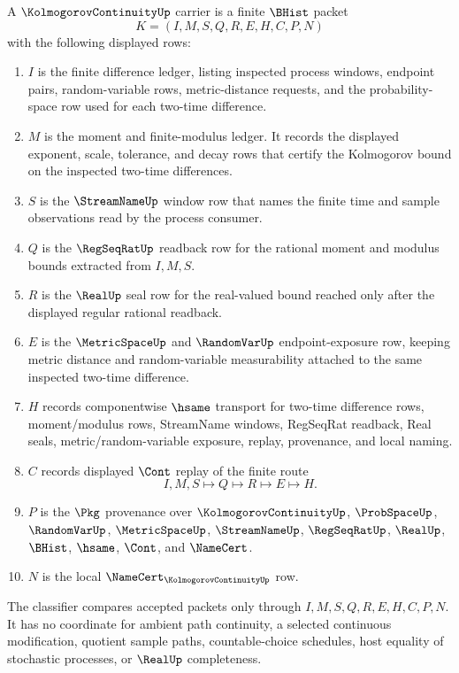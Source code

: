 \begin{definition}
\label{def:kolmogorov-continuity-carrier}
A $\KolmogorovContinuityUp$ carrier is a finite $\BHist$ packet
$$
K=(I,M,S,Q,R,E,H,C,P,N)
$$
with the following displayed rows:
\begin{enumerate}
\item $I$ is the finite difference ledger, listing inspected process windows, endpoint pairs, random-variable rows, metric-distance requests, and the probability-space row used for each two-time difference.
\item $M$ is the moment and finite-modulus ledger. It records the displayed exponent, scale, tolerance, and decay rows that certify the Kolmogorov bound on the inspected two-time differences.
\item $S$ is the $\StreamNameUp$ window row that names the finite time and sample observations read by the process consumer.
\item $Q$ is the $\RegSeqRatUp$ readback row for the rational moment and modulus bounds extracted from $I,M,S$.
\item $R$ is the $\RealUp$ seal row for the real-valued bound reached only after the displayed regular rational readback.
\item $E$ is the $\MetricSpaceUp$ and $\RandomVarUp$ endpoint-exposure row, keeping metric distance and random-variable measurability attached to the same inspected two-time difference.
\item $H$ records componentwise $\hsame$ transport for two-time difference rows, moment/modulus rows, StreamName windows, RegSeqRat readback, Real seals, metric/random-variable exposure, replay, provenance, and local naming.
\item $C$ records displayed $\Cont$ replay of the finite route
$$
I,M,S \longmapsto Q \longmapsto R \longmapsto E \longmapsto H .
$$
\item $P$ is the $\Pkg$ provenance over $\KolmogorovContinuityUp$, $\ProbSpaceUp$, $\RandomVarUp$, $\MetricSpaceUp$, $\StreamNameUp$, $\RegSeqRatUp$, $\RealUp$, $\BHist$, $\hsame$, $\Cont$, and $\NameCert$.
\item $N$ is the local $\NameCert_{\KolmogorovContinuityUp}$ row.
\end{enumerate}
The classifier compares accepted packets only through $I,M,S,Q,R,E,H,C,P,N$. It has no coordinate for ambient path continuity, a selected continuous modification, quotient sample paths, countable-choice schedules, host equality of stochastic processes, or $\RealUp$ completeness.
\end{definition}

